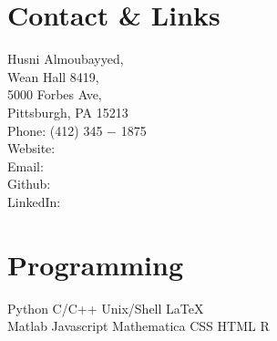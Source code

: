 \documentclass[]{deedy-resume-openfont}
\begin{document}
%
%

%
%


%
%

\begin{minipage}[t]{0.33\textwidth} 




\section{\color{Blue} Contact \& Links} 
Husni Almoubayyed,\\ 
Wean Hall 8419, \\ 5000 Forbes Ave, \\ Pittsburgh, PA 15213 \\
Phone: (412) 345 $-$ 1875 \\
Website: \href{https://www.husni.space}{} \\
Email: \href{mailto:husnial@cmu.edu}{} \\
Github: \href{https://github.com/hsnee}{} \\
LinkedIn:  \href{https://www.linkedin.com/in/husnialmoubayyed}{} 
\sectionsep




\section{\color{Blue} Programming}
\textbullet{} Python \textbullet{}  C/C++ \textbullet{} Unix/Shell \textbullet{} \LaTeX  \\
\textbullet{} Matlab \textbullet{} Javascript \textbullet{} Mathematica  \textbullet{} CSS \textbullet{} HTML \textbullet{} R \\
\sectionsep



\end{minipage}
\end{document}
